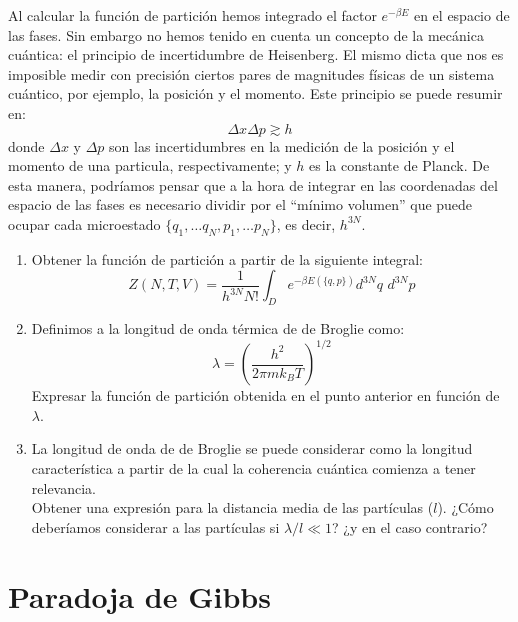 \documentclass[a4paper,11pt]{article}
\begin{document}
Al calcular la función de partición hemos integrado el factor
$e^{-\beta E}$ en el espacio de las fases. Sin embargo no hemos tenido
en cuenta un concepto de la mecánica cuántica: el principio de
incertidumbre de Heisenberg. El mismo dicta que nos es imposible medir
con precisión ciertos pares de magnitudes físicas de un sistema
cuántico, por ejemplo, la posición y el momento. Este principio se
puede resumir en:
$$ \Delta x \Delta p \gtrsim  h$$
donde $\Delta x$ y $\Delta p$ son las incertidumbres en la medición de
la posición y el momento de una particula, respectivamente; y $h$ es
la constante de Planck.
De esta manera, podríamos pensar que a la hora de integrar en las
coordenadas del espacio de las fases es necesario dividir por el
``mínimo volumen'' que puede ocupar cada microestado
$\{ q_1, \dots q_N, p_1, \dots p_N \}$, es decir, $h^{3N}$.

\begin{enumerate}[label=(\alph*),
                  leftmargin=2\parindent,
                  rightmargin=2\parindent]

    \item{\label{item:de-broglie-particion}
          Obtener la función de partición a partir de la siguiente
          integral:
          $$
          Z(N, T, V) =
            \frac{1}{h^{3N} N!}
            \int_D e^{-\beta E(\{q, p\})} d^{3N}q \,\, d^{3N}p
          $$
          }

    \item{Definimos a la longitud de onda térmica de de Broglie como:
          $$ \lambda = \left( \frac{h^2}{2\pi m k_B T} \right)^{1/2} $$
          Expresar la función de partición obtenida en el punto
          anterior en función de $\lambda$.
          }

    \item{La longitud de onda de de Broglie se puede considerar como la
          longitud característica a partir de la cual la coherencia
          cuántica comienza a tener relevancia.\\
          Obtener una expresión para la distancia media de las
          partículas ($l$). ¿Cómo deberíamos considerar a las
          partículas si $\lambda/l \ll 1$? ¿y en el caso contrario?
          }

\end{enumerate}


\section{Paradoja de Gibbs}
\end{document}

